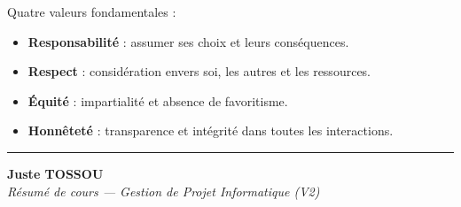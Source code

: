 \documentclass[11pt,a4paper]{article}
\begin{document}
Quatre valeurs fondamentales :
\begin{itemize}
    \item \textbf{Responsabilité} : assumer ses choix et leurs conséquences.
    \item \textbf{Respect} : considération envers soi, les autres et les ressources.
    \item \textbf{Équité} : impartialité et absence de favoritisme.
    \item \textbf{Honnêteté} : transparence et intégrité dans toutes les interactions.
\end{itemize}

\vspace{0.8em}
\hrule
\vspace{0.5em}

\noindent
\begin{flushright}
    \textbf{Juste TOSSOU}\\
    \textit{Résumé de cours --- Gestion de Projet Informatique (V2)}
\end{flushright}
\end{document}
